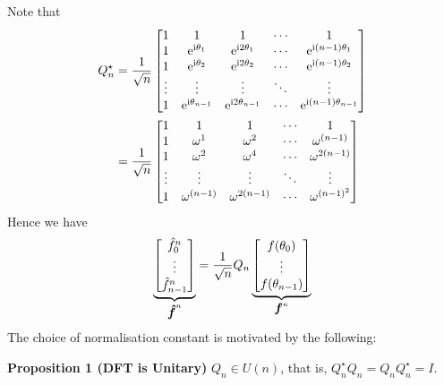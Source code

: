 Note that
\begin{align*}
Q_n^\ensuremath{\star} &= {1 \over \sqrt{n}} \begin{bmatrix}
1 & 1 & 1&  \ensuremath{\cdots} & 1 \\
1 & {\rm e}^{\I \ensuremath{\theta}_1} & {\rm e}^{\I 2 \ensuremath{\theta}_1} & \ensuremath{\cdots} & {\rm e}^{\I (n-1) \ensuremath{\theta}_1} \\
1 &  {\rm e}^{\I \ensuremath{\theta}_2}  & {\rm e}^{\I 2 \ensuremath{\theta}_2} & \ensuremath{\cdots} & {\rm e}^{\I (n-1)\ensuremath{\theta}_2} \\
\ensuremath{\vdots} & \ensuremath{\vdots} & \ensuremath{\vdots} & \ensuremath{\ddots} & \ensuremath{\vdots} \\
1 & {\rm e}^{\I \ensuremath{\theta}_{n-1}} & {\rm e}^{\I 2 \ensuremath{\theta}_{n-1}} & \ensuremath{\cdots} & {\rm e}^{\I (n-1) \ensuremath{\theta}_{n-1}}
\end{bmatrix} \\
&= {1 \over \sqrt{n}} \begin{bmatrix}
1 & 1 & 1&  \ensuremath{\cdots} & 1 \\
1 & \ensuremath{\omega}^{1} & \ensuremath{\omega}^{2} & \ensuremath{\cdots} & \ensuremath{\omega}^{(n-1)}\\
1 & \ensuremath{\omega}^{2} & \ensuremath{\omega}^{4} & \ensuremath{\cdots} & \ensuremath{\omega}^{2(n-1)}\\
\ensuremath{\vdots} & \ensuremath{\vdots} & \ensuremath{\vdots} & \ensuremath{\ddots} & \ensuremath{\vdots} \\
1 & \ensuremath{\omega}^{(n-1)} & \ensuremath{\omega}^{2(n-1)} & \ensuremath{\cdots} & \ensuremath{\omega}^{(n-1)^2}
\end{bmatrix}
\end{align*}
Hence we have
\[
\underbrace{\begin{bmatrix} \hat f_0^n \\ \vdots \\ \hat f_{n-1}^n \end{bmatrix}}_{{\mbox{\boldmath$\hat f$\unboldmath}}^n} =
{1 \over \sqrt{n}} Q_n \underbrace{\begin{bmatrix} f(\theta_0) \\ \vdots \\ f(\theta_{n-1}) \end{bmatrix}}_{\bm{{\mbox{\boldmath$f$\unboldmath}}}^n}
\]
The choice of normalisation constant is motivated by the following:

\textbf{Proposition 1 (DFT is Unitary)} $Q_n \ensuremath{\in} U(n)$, that is, $Q_n^\ensuremath{\star} Q_n = Q_n Q_n^\ensuremath{\star} = I$.


